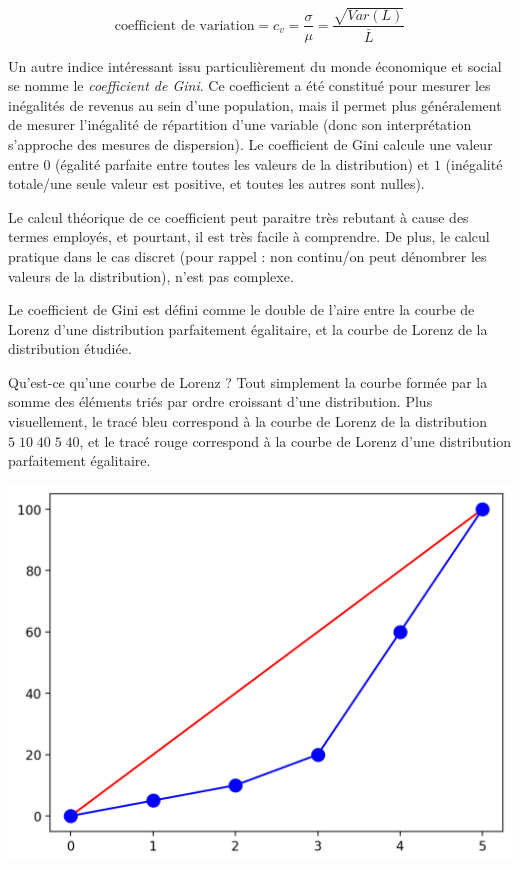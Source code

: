 \documentclass[11pt,a4paper]{article}
\begin{document}
\begin{center}
\begin{equation*}
\text{coefficient de variation} = c_{v} = \frac{\sigma}{\mu} = \frac{\sqrt{Var(L)}}{\bar{L}}
\end{equation*}
\end{center}


\newpage

Un autre indice intéressant issu particulièrement du monde économique et social se nomme le \textit{coefficient de Gini}.
Ce coefficient a été constitué pour mesurer les inégalités de revenus au sein d'une population, mais il permet plus généralement de mesurer l'inégalité de répartition d'une variable (donc son interprétation s'approche des mesures de dispersion).
Le coefficient de Gini calcule une valeur entre $ 0 $ (égalité parfaite entre toutes les valeurs de la distribution) et $ 1 $ (inégalité totale/une seule valeur est positive, et toutes les autres sont nulles).

Le calcul théorique de ce coefficient peut paraitre très rebutant à cause des termes employés, et pourtant, il est très facile à comprendre.
De plus, le calcul pratique dans le cas discret (pour rappel : non continu/on peut dénombrer les valeurs de la distribution), n'est pas complexe.

\bigskip

Le coefficient de Gini est défini comme le double de l'aire entre la courbe de Lorenz d'une distribution parfaitement égalitaire, et la courbe de Lorenz de la distribution étudiée.

Qu'est-ce qu'une courbe de Lorenz ?
Tout simplement la courbe formée par la somme des éléments triés par ordre croissant d'une distribution.
Plus visuellement, le tracé bleu correspond à la courbe de Lorenz de la distribution $ 5 \; 10 \; 40 \; 5 \; 40 $, et le tracé rouge correspond à la courbe de Lorenz d'une distribution parfaitement égalitaire.

\bigskip

\begin{center}
\includegraphics[scale=0.60]{images/exemple_courbe_lorenz_simple.png}
\end{center}
\end{document}

